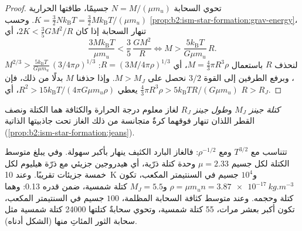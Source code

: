 \begin{proof}
تحوي السحابة $N = M/(\mu m_u)$ جسيمًا، طاقتها الحرارية
$K = \tfrac32 N k_{\mathrm B}T = \tfrac32 M k_{\mathrm B}T/(\mu m_u)$. وحسب
\cref{prop:b2:ism-star-formation:grav-energy}، تنهار السحابة إذا كان
$2K < \tfrac35 GM^2/R$، أي
\[
  \frac{3 M k_{\mathrm B} T}{\mu m_u} < \frac{3}{5}\,\frac{G M^2}{R}
  \iff M > \frac{5 k_{\mathrm B} T}{G \mu m_u}\, R .
\]
لنحذف $R$ باستعمال $M = \tfrac43\pi R^3\rho$، أي $R = (3M/4\pi\rho)^{1/3}$:
$M^{2/3} > \frac{5 k_{\mathrm B}T}{G\mu m_u}\,(3/4\pi\rho)^{1/3}$، وبرفع
الطرفين إلى القوة $3/2$ نحصل على $M > M_J$. وإذا حذفنا $M$ بدلًا من ذلك،
فإن $\tfrac43\pi R^3\rho > 5 k_{\mathrm B}T R/(G\mu m_u)$ يعطي $R^2 > 15
k_{\mathrm B}T/(4\pi G\mu m_u\rho)$، أي $R > R_J$.
\end{proof}

\begin{definition}\label{def:b2:ism-star-formation:jeans}
\emph{كتلة جينز} $M_J$ و\emph{طول
جينز} $R_J$ لغاز معلوم درجة الحرارة والكثافة
هما الكتلة ونصف القطر اللذان تنهار فوقهما كرةٌ متجانسة من ذلك الغاز
تحت جاذبيتها الذاتية (\cref{prop:b2:ism-star-formation:jeans}).
\end{definition}

تتناسب  مع $T^{3/2}$ ومع $\rho^{-1/2}$: فالغاز البارد الكثيف
ينهار بأكبر سهولة. وفي  يبلغ متوسط الكتلة لكل جسيم
$\mu = 2.33$ وحدة كتلة ذرّية، أي هيدروجين جزيئي مع ذرّة هيليوم لكل
خمسة جزيئات تقريبًا. وعند \qty{10}{K} و$10^4$ جسيم في السنتيمتر
المكعب، تكون $\rho = \mu m_u n = \qty{3.87e-17}{kg.m^{-3}}$
و$M_J = 5.5$ كتلة شمسية، ضمن  قدره \qty{0.13}{\parsec}:
وهما كتلة  وحجمه. وعند متوسط كثافة السحابة المظلمة،
$100$ جسيم في السنتيمتر المكعب، تكون  أكبر بعشر مرات، 55
كتلة شمسية، وتحوي سحابةٌ كتلتها \num{24000} كتلة شمسية مثل سحابة الثور
المئاتِ منها (الشكل أدناه).

